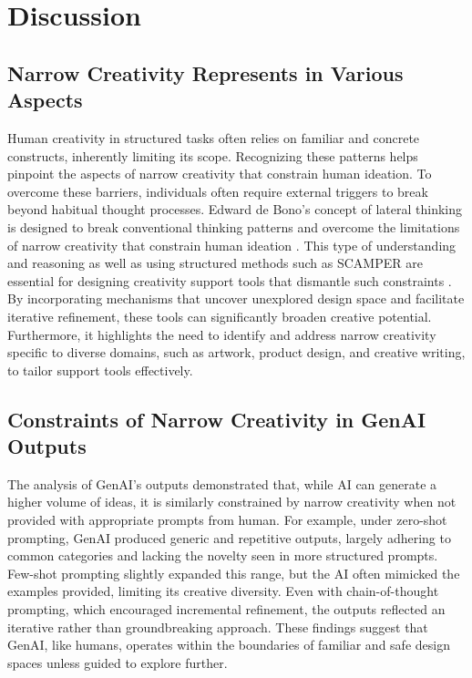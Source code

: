 \section{Discussion}


\subsection{Narrow Creativity Represents in Various Aspects}

Human creativity in structured tasks often relies on familiar and concrete constructs, inherently limiting its scope. 
Recognizing these patterns helps pinpoint the aspects of narrow creativity that constrain human ideation. 
To overcome these barriers, individuals often require external triggers to break beyond habitual thought processes. 
Edward de Bono's concept of lateral thinking is designed to break conventional thinking patterns and overcome the limitations of narrow creativity that constrain human ideation \cite{de1970lateral}. 
This type of understanding and reasoning as well as using structured methods such as SCAMPER \cite{eberle1996scamper} are essential for designing creativity support tools that dismantle such constraints \cite{mymap_ai_idea_generator}. 
By incorporating mechanisms that uncover unexplored design space and facilitate iterative refinement, these tools can significantly broaden creative potential. 
Furthermore, it highlights the need to identify and address narrow creativity specific to diverse domains, such as artwork, product design, and creative writing, to tailor support tools effectively.

\subsection{Constraints of Narrow Creativity in GenAI Outputs}

The analysis of GenAI's outputs demonstrated that, while AI can generate a higher volume of ideas, it is similarly constrained by narrow creativity when not provided with appropriate prompts from human. For example, under zero-shot prompting, GenAI produced generic and repetitive outputs, largely adhering to common categories and lacking the novelty seen in more structured prompts. Few-shot prompting slightly expanded this range, but the AI often mimicked the examples provided, limiting its creative diversity. Even with chain-of-thought prompting, which encouraged incremental refinement, the outputs reflected an iterative rather than groundbreaking approach. These findings suggest that GenAI, like humans, operates within the boundaries of familiar and safe design spaces unless guided to explore further.


